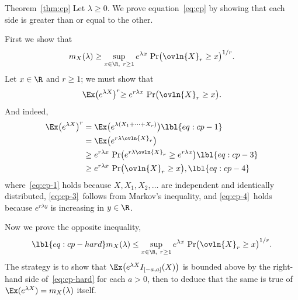 \begin{pfof}{Theorem~\ref{thm:cp}}
Let $\lambda \geq 0$.  We prove equation~\eqref{eq:cp} by showing that each
side is greater than or equal to the other.

First we show that 
\[
m_X(\lambda) 
\geq
\sup_{x \in \R, \ r \geq 1}
e^{\lambda x} \, \Pr\bigl(\ovln{X}_r \geq x\bigr)^{1/r}.
\]
Let $x \in \R$ and $r \geq 1$; we must show that
\[
\Ex\bigl(e^{\lambda X}\bigl)^r
\geq
e^{r\lambda x} \, \Pr\bigl(\ovln{X}_r \geq x\bigr).
\]
And indeed, 
% 
\begin{align}
\Ex\bigl(e^{\lambda X}\bigr)^r    &
=
\Ex\bigl(e^{\lambda(X_1 + \cdots + X_r)}\bigr)
\lbl{eq:cp-1} \\
&
=
\Ex\bigl(e^{r\lambda\ovln{X}_r}\bigr)
\nonumber       \\
&
\geq
e^{r\lambda x} \,
\Pr\bigl(
e^{r\lambda\ovln{X}_r} \geq e^{r\lambda x}
\bigr)
\lbl{eq:cp-3} \\
&
\geq
e^{r\lambda x} \, \Pr\bigl(\ovln{X}_r \geq x\bigr),
\lbl{eq:cp-4}
\end{align}
% 
where~\eqref{eq:cp-1} holds because $X, X_1, X_2, \ldots$ are independent
and identically distributed, \eqref{eq:cp-3}~follows from Markov's
inequality, and \eqref{eq:cp-4}~holds because $e^{r\lambda y}$ is
increasing in $y \in \R$.

Now we prove the opposite inequality, 
% 
\begin{equation}
\lbl{eq:cp-hard}
m_X(\lambda) 
\leq
\sup_{x \in \R, \ r \geq 1}
e^{\lambda x} \, \Pr\bigl(\ovln{X}_r \geq x\bigr)^{1/r}.
\end{equation}
% 
The strategy is to show that $\Ex\bigl( e^{\lambda X} I_{[-a, a]}(X)
\bigr)$ is bounded above by the right-hand side of~\eqref{eq:cp-hard} for
each $a > 0$, then to deduce that the same is true of $\Ex(e^{\lambda X}) =
m_X(\lambda)$ itself.


\end{pfof}
